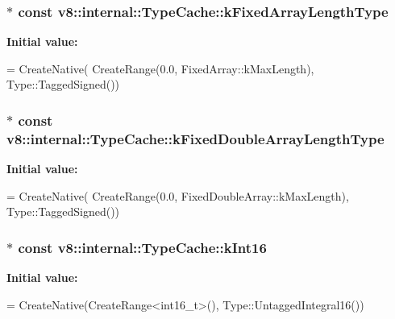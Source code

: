 \subsubsection[{\texorpdfstring{k\+Fixed\+Array\+Length\+Type}{kFixedArrayLengthType}}]{$\ast$ const v8\+::internal\+::\+Type\+Cache\+::k\+Fixed\+Array\+Length\+Type}\hypertarget{classv8_1_1internal_1_1_type_cache_a8a1deb16158ea1e72ce03847e0bce956}{}\label{classv8_1_1internal_1_1_type_cache_a8a1deb16158ea1e72ce03847e0bce956}
{\bfseries Initial value\+:}
\begin{DoxyCode}
= CreateNative(
      CreateRange(0.0, FixedArray::kMaxLength), Type::TaggedSigned())
\end{DoxyCode}
\subsubsection[{\texorpdfstring{k\+Fixed\+Double\+Array\+Length\+Type}{kFixedDoubleArrayLengthType}}]{$\ast$ const v8\+::internal\+::\+Type\+Cache\+::k\+Fixed\+Double\+Array\+Length\+Type}\hypertarget{classv8_1_1internal_1_1_type_cache_ac8c4b6adf660bdf618722dc59fb967f2}{}\label{classv8_1_1internal_1_1_type_cache_ac8c4b6adf660bdf618722dc59fb967f2}
{\bfseries Initial value\+:}
\begin{DoxyCode}
= CreateNative(
      CreateRange(0.0, FixedDoubleArray::kMaxLength), Type::TaggedSigned())
\end{DoxyCode}
\subsubsection[{\texorpdfstring{k\+Int16}{kInt16}}]{$\ast$ const v8\+::internal\+::\+Type\+Cache\+::k\+Int16}\hypertarget{classv8_1_1internal_1_1_type_cache_a0a19c438df18e8735ecd67b53a44e2f1}{}\label{classv8_1_1internal_1_1_type_cache_a0a19c438df18e8735ecd67b53a44e2f1}
{\bfseries Initial value\+:}
\begin{DoxyCode}
=
      CreateNative(CreateRange<int16\_t>(), Type::UntaggedIntegral16())
\end{DoxyCode}
